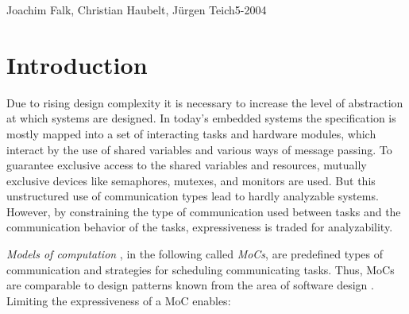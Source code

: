 \newcommand{\graphicPostfix}{pdf}
\newcommand{\resdir}{../../../HscdTeXRes/}
\newcommand{\code}[1]{\emph{#1}}
\newcommand{\SysteMoC}{\emph{SysteMoC}}
\newcommand{\SysteMoCV}{\emph{SysteMoC 1.0}}



\usepackage{multirow}
\usepackage{fancyvrb}

\makeatletter  %
\renewcommand{\verbatim@font}{%
  \ttfamily\small\catcode`\<=\active\catcode`\>=\active%
}
\makeatother   %




{Joachim Falk, Christian Haubelt, J\"urgen Teich}{5-2004}
\clearpage
\tableofcontents
\clearpage

\section{Introduction\label{intro}}
Due to rising design complexity it is necessary to increase
the level of abstraction at which systems are designed. In
today's embedded systems the specification is mostly mapped
into a set of interacting tasks and hardware modules, which 
interact by the use of shared variables and various ways of
message passing. To guarantee exclusive access to the shared
variables and resources, mutually exclusive devices like semaphores,
mutexes, and monitors are used. But this unstructured use
of communication types lead to hardly analyzable systems.
However, by constraining the type of communication
used between tasks and the communication behavior of the tasks,
expressiveness is traded for analyzability.

\emph{Models of computation}
\cite{embsft:2002}, in the following called \emph{MoCs}, are
predefined types of communication and strategies for scheduling
communicating tasks. Thus, MoCs are comparable to design
patterns known from the area of software design \cite{gamma:1995}.
Limiting the expressiveness of a MoC enables:

